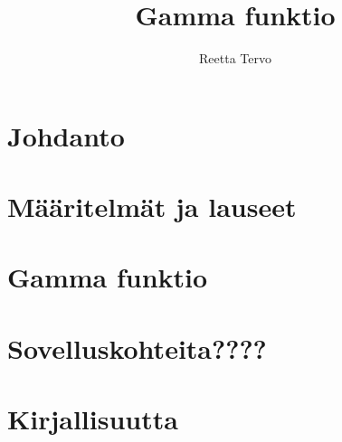 \documentclass[12pt]{article}
\title{Gamma funktio}
\author{Reetta Tervo}
\begin{document}
\maketitle

\newpage
\setcounter{tocdepth}{1}
\tableofcontents

\newpage
\section{Johdanto}
\newpage
\section{Määritelmät ja lauseet}\label{luk: määritelmä} \label{luk: lause}
\newpage
\section{Gamma funktio}\label{luk: gammafunktio}
\newpage
\section{Sovelluskohteita????}
\newpage
\section{Kirjallisuutta}
\end{document}
